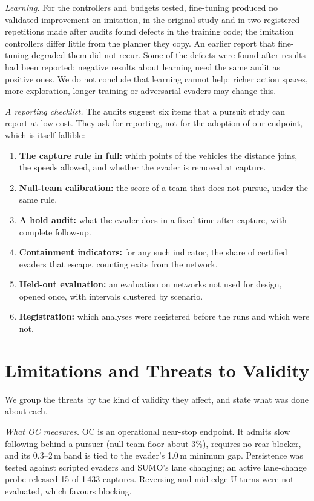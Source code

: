 \documentclass[5p,twocolumn]{elsarticle}
\begin{document}
\emph{Learning.} For the controllers and budgets tested, fine-tuning produced no validated improvement on
imitation, in the original study and in two registered repetitions made after audits found defects in the training
code; the imitation controllers differ little from the planner they copy. An earlier report that fine-tuning
degraded them did not recur. Some of the defects were found after results had been reported: negative results about
learning need the same audit as positive ones. We do not conclude that learning cannot help: richer action spaces,
more exploration, longer training or adversarial evaders may change this.

\emph{A reporting checklist.} The audits suggest six items that a pursuit study can report at low cost. They ask for
reporting, not for the adoption of our endpoint, which is itself fallible:
\begin{enumerate}
\item \textbf{The capture rule in full:} which points of the vehicles the distance joins, the speeds allowed, and
whether the evader is removed at capture.
\item \textbf{Null-team calibration:} the score of a team that does not pursue, under the same rule.
\item \textbf{A hold audit:} what the evader does in a fixed time after capture, with complete follow-up.
\item \textbf{Containment indicators:} for any such indicator, the share of certified evaders that escape, counting
exits from the network.
\item \textbf{Held-out evaluation:} an evaluation on networks not used for design, opened once, with intervals
clustered by scenario.
\item \textbf{Registration:} which analyses were registered before the runs and which were not.
\end{enumerate}

\section{Limitations and Threats to Validity}
\label{sec:limitations}

We group the threats by the kind of validity they affect, and state what was done about each.

\emph{What OC measures.} OC is an operational near-stop endpoint. It admits slow following behind a pursuer (null-team
floor about 3\%), requires no rear blocker, and its 0.3--2\,m band is tied to the evader's 1.0\,m minimum gap.
Persistence was tested against scripted evaders and SUMO's lane changing; an active lane-change probe released 15 of
1\,433 captures. Reversing and mid-edge U-turns were not evaluated, which favours blocking.
\end{document}
